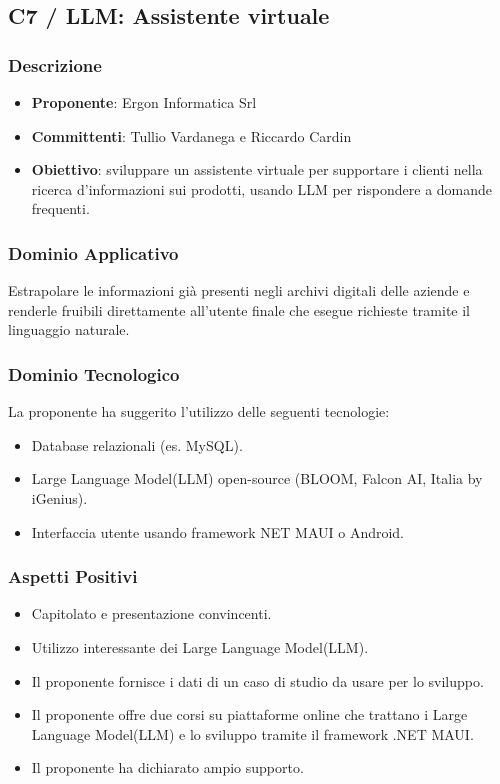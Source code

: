 \documentclass[a4paper, 12pt]{article}
\begin{document}
\subsection{C7 / LLM: Assistente virtuale}

\subsubsection{Descrizione}
\begin{itemize}
    \item \textbf{Proponente}: Ergon Informatica Srl
    \item \textbf{Committenti}: Tullio Vardanega e Riccardo Cardin
    \item \textbf{Obiettivo}: sviluppare un assistente virtuale per supportare i clienti nella ricerca d'informazioni sui prodotti, usando LLM per rispondere a domande frequenti.
\end{itemize}

\subsubsection{Dominio Applicativo}
Estrapolare le informazioni già presenti negli archivi digitali delle aziende e renderle fruibili direttamente all’utente finale che esegue richieste tramite il linguaggio naturale.

\subsubsection{Dominio Tecnologico}
La proponente ha suggerito l’utilizzo delle seguenti tecnologie:
\begin{itemize}
    \item Database relazionali (es. MySQL).
    \item Large Language Model(LLM) open-source (BLOOM, Falcon AI, Italia by iGenius).
    \item Interfaccia utente usando framework NET MAUI o Android.
\end{itemize}

\subsubsection{Aspetti Positivi}
\begin{itemize}
    \item Capitolato e presentazione convincenti.
    \item Utilizzo interessante dei Large Language Model(LLM).
    \item Il proponente fornisce i dati di un caso di studio da usare per lo sviluppo.
    \item Il proponente offre due corsi su piattaforme online che trattano i Large Language Model(LLM) e lo sviluppo tramite il framework .NET MAUI.
    \item Il proponente ha dichiarato ampio supporto.
\end{itemize}
\end{document}
